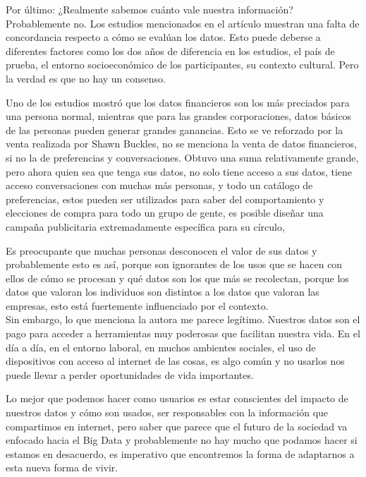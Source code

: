 \documentclass[12pt]{report}
\begin{document}
\begin{enumerate}[label=\textbf{\arabic*.}, leftmargin=*]
Por último: ¿Realmente sabemos cuánto vale nuestra información? Probablemente no. Los estudios mencionados en el artículo muestran una falta de concordancia respecto a cómo se evalúan los datos. Esto puede deberse a diferentes factores como los dos años de diferencia en los estudios, el país de prueba, el entorno socioeconómico de los participantes, su contexto cultural. Pero la verdad es que no hay un consenso.

Uno de los estudios mostró que los datos financieros son los más preciados para una persona normal, mientras que para las grandes corporaciones, datos básicos de las personas pueden generar grandes ganancias. Esto se ve reforzado por la venta realizada por Shawn Buckles,  no se menciona la venta de datos financieros, si no la de preferencias y conversaciones. Obtuvo una suma relativamente grande, pero ahora quien sea que tenga sus datos, no solo tiene acceso a sus datos, tiene acceso conversaciones con muchas más personas, y todo un catálogo de preferencias, estos pueden ser utilizados para saber del comportamiento y elecciones de compra para todo un grupo de gente, es posible diseñar una campaña publicitaria extremadamente específica para su círculo,

Es preocupante que muchas personas desconocen el valor de sus datos y probablemente esto es así, porque son ignorantes de los usos que se hacen con ellos de cómo se procesan y qué datos son los que más se recolectan,  porque los datos que valoran los individuos son distintos a los datos que valoran las empresas, esto está fuertemente influenciado por el contexto.\\

Sin embargo, lo que menciona la autora me parece legítimo. Nuestros datos son el pago para acceder a herramientas muy poderosas que facilitan nuestra vida. En el día a día, en el entorno laboral, en muchos ambientes sociales, el uso de dispositivos con acceso al internet de las cosas, es algo común y no usarlos nos puede llevar a perder oportunidades de vida importantes.

Lo mejor que podemos hacer como usuarios es estar conscientes del impacto de nuestros datos y cómo son usados, ser responsables con la información que compartimos en internet, pero saber que parece que el futuro de la sociedad va enfocado hacia el Big Data y probablemente no hay mucho que podamos hacer si estamos en desacuerdo, es imperativo que encontremos la forma de adaptarnos a esta nueva forma de vivir.





\end{enumerate}
\end{document}
